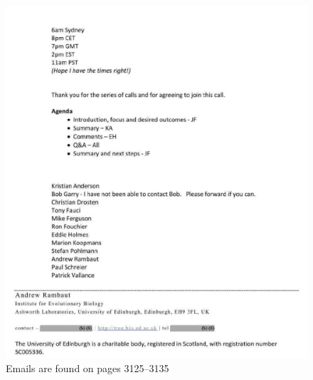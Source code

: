 \documentclass[11pt]{article}
\begin{document}
\begin{figure}[htbp]
\centering
\includegraphics[width=.9\linewidth]{./images/email-zh-9.png}
\caption{Emails are found on pages 3125--3135}
\end{figure}
\end{document}
